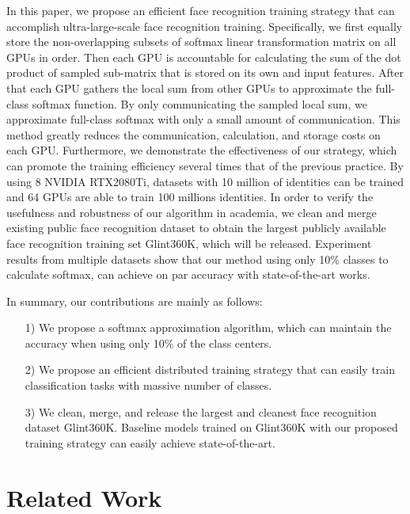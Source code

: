 \documentclass[letterpaper]{article} \usepackage{style/aaai21}  \usepackage{times}  \usepackage{helvet} \usepackage{courier}  \usepackage[hyphens]{url}  \usepackage{graphicx} \usepackage{color}
\begin{document}
In this paper, we propose an efficient face recognition training strategy that can accomplish ultra-large-scale face recognition training. Specifically, we first equally store the non-overlapping subsets of softmax linear transformation matrix on all GPUs in order. Then each GPU is accountable for calculating the sum of the dot product of sampled sub-matrix that is stored on its own and input features. After that each GPU gathers the local sum from other GPUs to approximate the full-class softmax function. By only communicating the sampled local sum, we approximate full-class softmax with only a small amount of communication. This method greatly reduces the communication, calculation, and storage costs on each GPU. Furthermore, we demonstrate the effectiveness of our strategy, which can promote the training efficiency several times that of the previous practice. By using 8 NVIDIA RTX2080Ti, datasets with 10 million of identities can be trained and 64 GPUs are able to train 100 millions identities. In order to verify the usefulness and robustness of our algorithm in academia, we clean and merge existing public face recognition dataset to obtain the largest publicly available face recognition training set Glint360K, which will be released. Experiment results from multiple datasets show that our method using only 10\% classes to calculate softmax, can achieve on par accuracy with state-of-the-art works.

In summary, our contributions are mainly as follows:
\begin{itemize}
	\item[1)] We propose a softmax approximation algorithm, which can maintain the accuracy when using only 10\% of the class centers.
	\item[2)] We propose an efficient distributed training strategy that can easily train classification tasks with massive number of classes.
	\item[3)] We clean, merge, and release the largest and cleanest face recognition dataset Glint360K. Baseline models trained on Glint360K with our proposed training strategy can easily achieve state-of-the-art.
\end{itemize}


\section{Related Work}
\end{document}
